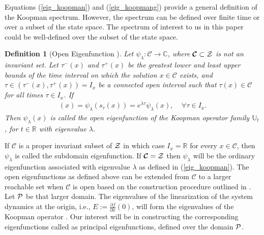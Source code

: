\documentclass[11pt]{article}
\theoremstyle{plain}
\newtheorem{definition}[theorem]{Definition}
\newcommand{\cZ}{{\cal Z}}
\newcommand{\cP}{{\cal P}}
\newcommand{\mC}{{\mathbb C}}
\newcommand{\mR}{{\mathbb R}}
\newcommand{\mU}{{\mathbb U}}
\newcommand{\bC}{{\boldsymbol{\mathcal C}}}
\newcommand{\bE}{{\mathbf E}}
\begin{document}
Equations (\ref{eig_koopman}) and (\ref{eig_koopmang}) provide a general definition of the Koopman spectrum. However, the spectrum can be defined over finite time or over a subset of the state space. The spectrum of interest to us in this paper could be well-defined over the subset of the state space. 
\begin{definition}[Open Eigenfunction \cite{mezic2020spectrum}]\label{definition_openeigenfunction}
Let $\psi_\lambda: \bC\to \mC$, where $\bC\subset \cZ$ is not an invariant set. Let $\tau^-(x)$ and $\tau^+ (x)$ be the greatest lower and least upper bounds of the time interval on which the solution $x\in  \bC$ exists, and
$\tau \in (\tau^-(x),\tau^+(x))= I_x$ be a connected open interval such that $\tau (x) \in \bC$ for all times $\tau \in I_x$.
If
\begin{align}[\mU_\tau \psi_\lambda](x) = \psi_\lambda(s_\tau(x)) =e^{\lambda \tau}  \psi_\lambda (x),\;\;\;\;\forall \tau \in I_x. 
\end{align}
Then $\psi_\lambda(x)$ is called the open eigenfunction of the Koopman operator family $\mU_t$, for $t\in \mR$ with eigenvalue $\lambda$. 
\end{definition}
If $\bC$ is a proper invariant subset of $\cZ$ in which case $I_x=\mR$ for every $x\in \bC$, then $\psi_\lambda$ is called the subdomain eigenfunction. If $\bC=\cZ$ then $\psi_\lambda$ will be the ordinary eigenfunction associated with eigenvalue $\lambda$ as defined in (\ref{eig_koopman}). The open eigenfunctions as defined above can be extended from $\bC$ to a larger reachable set when $\bC$ is open based on the construction procedure outlined in  \cite[Definition 5.2, Lemma 5.1]{mezic2020spectrum}. Let $\cP$ be that larger domain. The eigenvalues of the linearization of the system dynamics at the origin, i.e., $E:=\frac{\partial f}{\partial x}(0)$, will form the eigenvalues of the Koopman operator \cite[Proposition 5.8]{mezic2020spectrum}. Our interest will be in constructing the corresponding eigenfunctions called as principal eigenfunctions, defined over the domain $\cP$.
\end{document}
